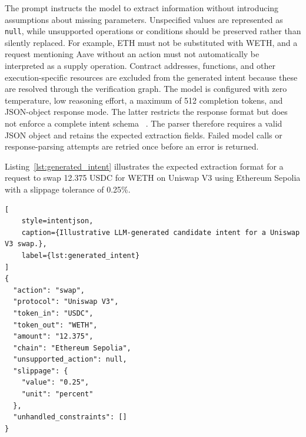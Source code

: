 The prompt instructs the model to extract information without
introducing assumptions about missing parameters. Unspecified
values are represented as \texttt{null}, while unsupported
operations or conditions should be preserved rather than
silently replaced. For example, ETH must not be substituted
with WETH, and a request mentioning Aave without an action
must not automatically be interpreted as a supply operation.
Contract addresses, functions, and other execution-specific
resources are excluded from the generated intent because
these are resolved through the verification graph. The model is configured with zero temperature, low reasoning
effort, a maximum of 512 completion tokens, and JSON-object
response mode. The latter restricts the response format but
does not enforce a complete intent schema
~\cite{implGroqJSON}. The parser therefore requires a valid
JSON object and retains the expected extraction fields.
Failed model calls or response-parsing attempts are retried
once before an error is returned.

Listing~\ref{lst:generated_intent} illustrates the expected
extraction format for a request to swap 12.375 USDC for WETH
on Uniswap V3 using Ethereum Sepolia with a slippage
tolerance of 0.25\%.



\begin{lstlisting}[
    style=intentjson,
    caption={Illustrative LLM-generated candidate intent for a Uniswap V3 swap.},
    label={lst:generated_intent}
]
{
  "action": "swap",
  "protocol": "Uniswap V3",
  "token_in": "USDC",
  "token_out": "WETH",
  "amount": "12.375",
  "chain": "Ethereum Sepolia",
  "unsupported_action": null,
  "slippage": {
    "value": "0.25",
    "unit": "percent"
  },
  "unhandled_constraints": []
}
\end{lstlisting}


